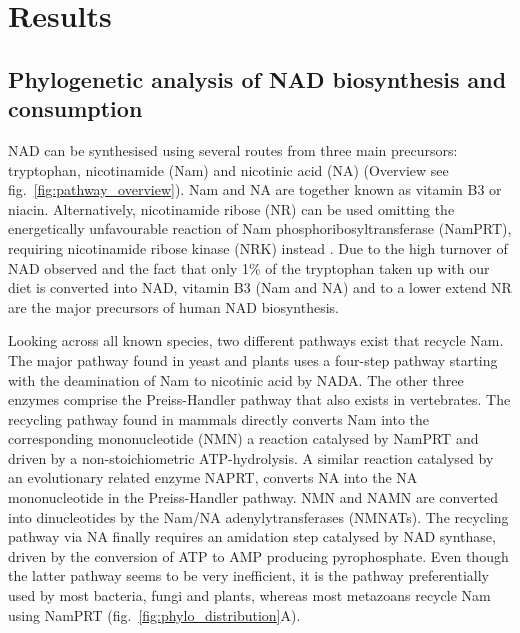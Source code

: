 
\section{Results}

\subsection{Phylogenetic analysis of NAD biosynthesis and consumption}

NAD can be synthesised using several routes from three main precursors: tryptophan, nicotinamide (Nam) and nicotinic acid (NA) (Overview see fig.~\ref{fig:pathway_overview}). Nam and NA are together known as vitamin B3 or niacin. Alternatively, nicotinamide ribose (NR) can be used omitting the energetically unfavourable reaction of Nam phosphoribosyltransferase (NamPRT), requiring nicotinamide ribose kinase (NRK) instead \cite{Yoshino2018}. Due to the high turnover of NAD observed and the fact that only 1\% of the tryptophan taken up with our diet is converted into NAD, vitamin B3 (Nam and NA) and to a lower extend NR are the major precursors of human NAD biosynthesis.

Looking across all known species, two different pathways exist that recycle Nam. The major pathway found in yeast and plants uses a four-step pathway starting with the deamination of Nam to nicotinic acid by NADA. The other three enzymes comprise the Preiss-Handler pathway that also exists in vertebrates. The recycling pathway found in mammals directly converts Nam into the corresponding mononucleotide (NMN) a reaction catalysed by NamPRT and driven by a non-stoichiometric ATP-hydrolysis. A similar reaction catalysed by an evolutionary related enzyme NAPRT, converts NA into the NA mononucleotide in the Preiss-Handler pathway. NMN and NAMN are converted into dinucleotides by the Nam/NA adenylytransferases (NMNATs). The recycling pathway via NA finally requires an amidation step catalysed by NAD synthase, driven by the conversion of ATP to AMP producing pyrophosphate. Even though the latter pathway seems to be very inefficient, it is the pathway preferentially used by most bacteria, fungi and plants, whereas most metazoans recycle Nam using NamPRT (fig.~\ref{fig:phylo_distribution}A).

